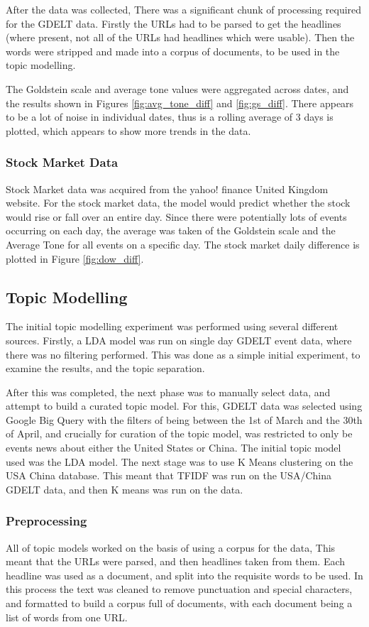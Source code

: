 After the data was collected, There was a significant chunk of processing required for the GDELT data. Firstly the URLs had to be parsed to get the headlines (where present, not all of the URLs had headlines which were usable). Then the words were stripped and made into a corpus of documents, to be used in the topic modelling. 

The Goldstein scale and average tone values were aggregated across dates, and the results shown in Figures \ref{fig:avg_tone_diff} and \ref{fig:gs_diff}. There appears to be a lot of noise in individual dates, thus is a rolling average of 3 days is plotted, which appears to show more trends in the data. 

 
\subsubsection{Stock Market Data}
Stock Market data was acquired from the yahoo! finance United Kingdom website. For the stock market data, the model would predict whether the stock would rise or fall over an entire day. Since there were potentially lots of events occurring on each day, the average was taken of the Goldstein scale and the Average Tone for all events on a specific day. The stock market daily difference is plotted in Figure \ref{fig:dow_diff}. 

\subsection{Topic Modelling}

The initial topic modelling experiment was performed using several different sources. Firstly, a LDA model was run on single day GDELT event data, where there was no filtering performed. This was done as a simple initial experiment, to examine the results, and the topic separation. 

After this was completed, the next phase was to manually select data, and attempt to build a curated topic model. For this, GDELT data was selected using Google Big Query with the filters of being between the 1st of March and the 30th of April, and crucially for curation of the topic model, was restricted to only be events news about either the United States or China. The initial topic model used was the LDA model. The next stage was to use K Means clustering on  the USA China database. This meant that TFIDF was run on the USA/China GDELT data, and then K means was run on the data.

\subsubsection{Preprocessing}
All of topic models worked on the basis of using a corpus for the data, This meant that the URLs were parsed, and then headlines taken from them. Each headline was used as a document, and split into the requisite words to be used. In this process the text was cleaned to remove punctuation and special characters, and formatted to build a corpus full of documents, with each document being a list of words from one URL. 
